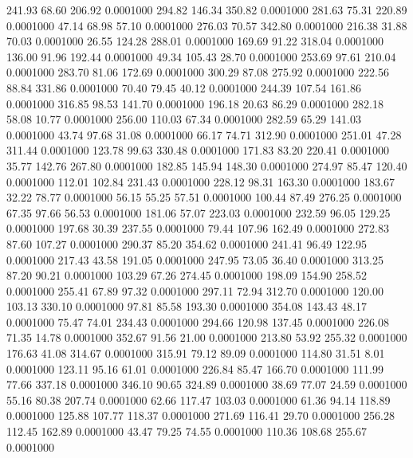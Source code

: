  241.93   68.60  206.92   0.0001000
 294.82  146.34  350.82   0.0001000
 281.63   75.31  220.89   0.0001000
  47.14   68.98   57.10   0.0001000
 276.03   70.57  342.80   0.0001000
 216.38   31.88   70.03   0.0001000
  26.55  124.28  288.01   0.0001000
 169.69   91.22  318.04   0.0001000
 136.00   91.96  192.44   0.0001000
  49.34  105.43   28.70   0.0001000
 253.69   97.61  210.04   0.0001000
 283.70   81.06  172.69   0.0001000
 300.29   87.08  275.92   0.0001000
 222.56   88.84  331.86   0.0001000
  70.40   79.45   40.12   0.0001000
 244.39  107.54  161.86   0.0001000
 316.85   98.53  141.70   0.0001000
 196.18   20.63   86.29   0.0001000
 282.18   58.08   10.77   0.0001000
 256.00  110.03   67.34   0.0001000
 282.59   65.29  141.03   0.0001000
  43.74   97.68   31.08   0.0001000
  66.17   74.71  312.90   0.0001000
 251.01   47.28  311.44   0.0001000
 123.78   99.63  330.48   0.0001000
 171.83   83.20  220.41   0.0001000
  35.77  142.76  267.80   0.0001000
 182.85  145.94  148.30   0.0001000
 274.97   85.47  120.40   0.0001000
 112.01  102.84  231.43   0.0001000
 228.12   98.31  163.30   0.0001000
 183.67   32.22   78.77   0.0001000
  56.15   55.25   57.51   0.0001000
 100.44   87.49  276.25   0.0001000
  67.35   97.66   56.53   0.0001000
 181.06   57.07  223.03   0.0001000
 232.59   96.05  129.25   0.0001000
 197.68   30.39  237.55   0.0001000
  79.44  107.96  162.49   0.0001000
 272.83   87.60  107.27   0.0001000
 290.37   85.20  354.62   0.0001000
 241.41   96.49  122.95   0.0001000
 217.43   43.58  191.05   0.0001000
 247.95   73.05   36.40   0.0001000
 313.25   87.20   90.21   0.0001000
 103.29   67.26  274.45   0.0001000
 198.09  154.90  258.52   0.0001000
 255.41   67.89   97.32   0.0001000
 297.11   72.94  312.70   0.0001000
 120.00  103.13  330.10   0.0001000
  97.81   85.58  193.30   0.0001000
 354.08  143.43   48.17   0.0001000
  75.47   74.01  234.43   0.0001000
 294.66  120.98  137.45   0.0001000
 226.08   71.35   14.78   0.0001000
 352.67   91.56   21.00   0.0001000
 213.80   53.92  255.32   0.0001000
 176.63   41.08  314.67   0.0001000
 315.91   79.12   89.09   0.0001000
 114.80   31.51    8.01   0.0001000
 123.11   95.16   61.01   0.0001000
 226.84   85.47  166.70   0.0001000
 111.99   77.66  337.18   0.0001000
 346.10   90.65  324.89   0.0001000
  38.69   77.07   24.59   0.0001000
  55.16   80.38  207.74   0.0001000
  62.66  117.47  103.03   0.0001000
  61.36   94.14  118.89   0.0001000
 125.88  107.77  118.37   0.0001000
 271.69  116.41   29.70   0.0001000
 256.28  112.45  162.89   0.0001000
  43.47   79.25   74.55   0.0001000
 110.36  108.68  255.67   0.0001000
